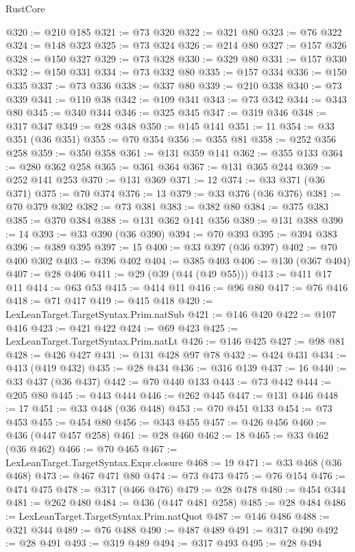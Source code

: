 \begin{lexlean}{RustCore}
\begin{coremodule}
@320 := @210 @185
@321 := @73 @320
@322 := @321 @80
@323 := @76 @322
@324 := @148 @323
@325 := @73 @324
@326 := @214 @80
@327 := @157 @326
@328 := @150 @327
@329 := @73 @328
@330 := @329 @80
@331 := @157 @330
@332 := @150 @331
@334 := @73 @332 @80
@335 := @157 @334
@336 := @150 @335
@337 := @73 @336
@338 := @337 @80
@339 := @210 @338
@340 := @73 @339
@341 := @110 @38
@342 := @109 @341
@343 := @73 @342
@344 := @343 @80
@345 := @340 @344
@346 := @325 @345
@347 := @319 @346
@348 := @317 @347
@349 := @28 @348
@350 := @145 @141
@351 := 11
@354 := @33 @351 (@36 @351)
@355 := @70 @354
@356 := @355 @81
@358 := @252 @356 @258
@359 := @350 @358
@361 := @131 @359 @141
@362 := @355 @133
@364 := @280 @362 @258
@365 := @361 @364
@367 := @131 @365 @244
@369 := @252 @141 @253
@370 := @131 @369
@371 := 12
@374 := @33 @371 (@36 @371)
@375 := @70 @374
@376 := 13
@379 := @33 @376 (@36 @376)
@381 := @70 @379 @302
@382 := @73 @381
@383 := @382 @80
@384 := @375 @383
@385 := @370 @384
@388 := @131 @362 @141 @356
@389 := @131 @388
@390 := 14
@393 := @33 @390 (@36 @390)
@394 := @70 @393
@395 := @394 @383
@396 := @389 @395
@397 := 15
@400 := @33 @397 (@36 @397)
@402 := @70 @400 @302
@403 := @396 @402
@404 := @385 @403
@406 := @130 (@367 @404)
@407 := @28 @406
@411 := @29 (@39 (@44 (@49 @55)))
@413 := @411 @17 @11
@414 := @63 @53
@415 := @414 @11
@416 := @96 @80
@417 := @76 @416
@418 := @71 @417
@419 := @415 @418
@420 := LexLeanTarget.TargetSyntax.Prim.natSub
@421 := @146 @420
@422 := @107 @416
@423 := @421 @422
@424 := @69 @423
@425 := LexLeanTarget.TargetSyntax.Prim.natLt
@426 := @146 @425
@427 := @98 @81
@428 := @426 @427
@431 := @131 @428 @97 @78
@432 := @424 @431
@434 := @413 (@419 @432)
@435 := @28 @434
@436 := @316 @139
@437 := 16
@440 := @33 @437 (@36 @437)
@442 := @70 @440 @133
@443 := @73 @442
@444 := @205 @80
@445 := @443 @444
@446 := @262 @445
@447 := @131 @446
@448 := 17
@451 := @33 @448 (@36 @448)
@453 := @70 @451 @133
@454 := @73 @453
@455 := @454 @80
@456 := @343 @455
@457 := @426 @456
@460 := @436 (@447 @457 @258)
@461 := @28 @460
@462 := 18
@465 := @33 @462 (@36 @462)
@466 := @70 @465
@467 := LexLeanTarget.TargetSyntax.Expr.closure
@468 := 19
@471 := @33 @468 (@36 @468)
@473 := @467 @471 @80
@474 := @73 @473
@475 := @76 @154
@476 := @474 @475
@478 := @317 (@466 @476)
@479 := @28 @478
@480 := @454 @344
@481 := @262 @480
@484 := @436 (@447 @481 @258)
@485 := @28 @484
@486 := LexLeanTarget.TargetSyntax.Prim.natQuot
@487 := @146 @486
@488 := @321 @344
@489 := @76 @488
@490 := @487 @489
@491 := @317 @490
@492 := @28 @491
@493 := @319 @489
@494 := @317 @493
@495 := @28 @494

\end{coremodule}
\end{lexlean}
